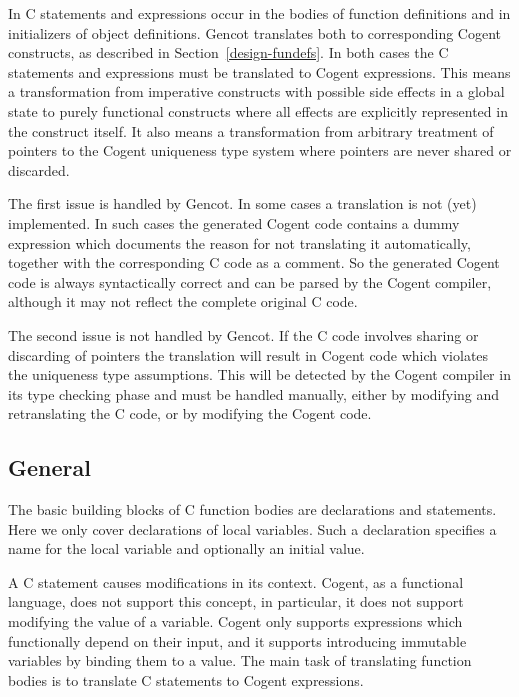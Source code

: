 In C statements and expressions occur in the bodies of function definitions and in initializers of object definitions. Gencot translates
both to corresponding Cogent constructs, as described in Section~\ref{design-fundefs}. In both cases the C statements and expressions
must be translated to Cogent expressions. This means a transformation from imperative constructs with possible side effects in a global
state to purely functional constructs where all effects are explicitly represented in the construct itself. It also means a transformation
from arbitrary treatment of pointers to the Cogent uniqueness type system where pointers are never shared or discarded.

The first issue is handled by Gencot. In some cases a translation is not (yet) implemented. In such cases the generated
Cogent code contains a dummy expression which documents the reason for not translating it automatically, together with
the corresponding C code as a comment. So the generated Cogent code is always syntactically correct and can be parsed
by the Cogent compiler, although it may not reflect the complete original C code.

The second issue is not handled by Gencot. If the C code involves sharing or discarding of pointers the translation will result in Cogent
code which violates the uniqueness type assumptions. This will be detected by the Cogent compiler in its type checking phase and must be
handled manually, either by modifying and retranslating the C code, or by modifying the Cogent code.

\subsection{General}
\label{design-cstats-general}

The basic building blocks of C function bodies are declarations and statements. Here we only cover declarations of 
local variables. Such a declaration specifies a name for the local variable and optionally an initial value.

A C statement causes modifications in its context. Cogent, as a functional language, does not support this concept,
in particular, it does not support modifying the value of a variable. Cogent only supports expressions which functionally
depend on their input, and it supports introducing immutable variables by binding them to a value. 
The main task of translating function bodies is to translate C statements to Cogent expressions.

